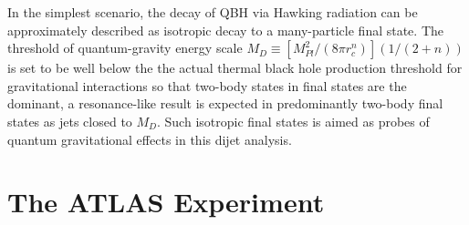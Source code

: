 \documentclass[UTF8,12pt]{ctexart}
\numberwithin{equation}{section}
\begin{document}
In the simplest scenario, the decay of QBH via Hawking radiation can be approximately described as isotropic decay to a many-particle final state.  The threshold of quantum-gravity energy scale $M_D \equiv\left[M_{P l}^2 /\left(8 \pi r_c^n\right)\right](1 /(2+n))$ is set to be well below the 
the actual thermal black hole production threshold for gravitational interactions so that two-body states in final states are the dominant, a resonance-like result is expected in predominantly two-body final states as jets closed to $M_D$. Such isotropic final states is aimed as probes of quantum gravitational effects in this dijet analysis.



%
%
%



\newpage
{}
\section{The ATLAS Experiment}
\label{sec:3}
\end{document}
